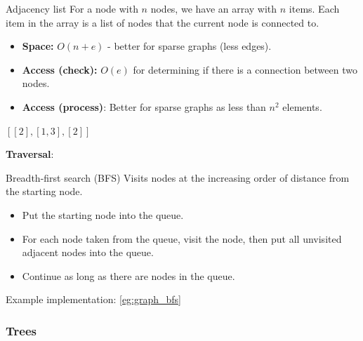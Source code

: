 \begin{theorem}
    {Adjacency list}
    For a node with $n$ nodes, we have an array with $n$ items. Each item in the array is a list of nodes that the current node is connected to.

    \begin{itemize}
        \item \textbf{Space:} $O(n+e)$ - better for sparse graphs (less edges).
        \item \textbf{Access (check):} $O(e)$ for determining if there is a connection between two nodes.
        \item \textbf{Access (process)}: Better for sparse graphs as less than $n^2$ elements.
    \end{itemize}

    \tcblower

    \begin{center}
        \hspace{1cm}
        $
            [
                    [2],
                    [1,3],
                    [2]
                ]
        $
    \end{center}
\end{theorem}

\textbf{Traversal}:

\begin{theorem}
    {Breadth-first search (BFS)}
    Visits nodes at the increasing order of distance from the starting node.
    \begin{itemize}
        \item Put the starting node into the queue.
        \item For each node taken from the queue, visit the node, then put all unvisited adjacent nodes into the queue.
        \item Continue as long as there are nodes in the queue.
    \end{itemize}
    \tcblower
    Example implementation: \ref{eg:graph_bfs}
\end{theorem}

\label{thm:graph_bfs}

\subsubsection{Trees}

